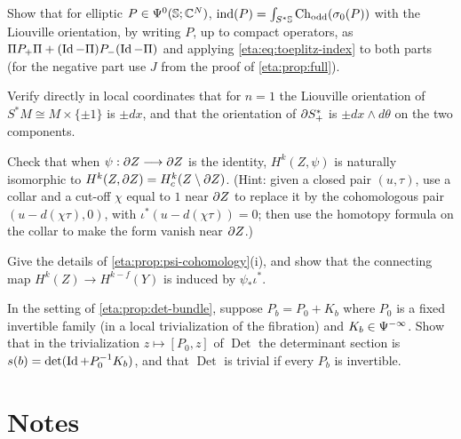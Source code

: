 \begin{exercise}\label{eta:ex:circle-AS}
Show that for elliptic $P\in\Psi^{0}(\mathbb{S};\mathbb{C}^N)$,
$\operatorname{ind}(P)=\int_{S^*\mathbb{S}}\operatorname{Ch}_{\mathrm{odd}}(\sigma_0(P))$ with the Liouville orientation, by writing
$P$, up to compact operators, as $\Pi P_+\Pi+(\operatorname{Id}-\Pi)P_-(\operatorname{Id}-\Pi)$ and applying
\eqref{eta:eq:toeplitz-index} to both parts (for the negative part use $J$ from the proof of
\cref{eta:prop:full}).
\end{exercise}

\begin{exercise}\label{eta:ex:orientation}
Verify directly in local coordinates that for $n=1$ the Liouville orientation of
$S^*M\cong M\times\{\pm1\}$ is $\pm dx$, and that the orientation of $\partial S^*_+$ is
$\pm dx\wedge d\theta$ on the two components.
\end{exercise}

\begin{exercise}\label{eta:ex:relative}
Check that when $\psi:\partial Z\longrightarrow\partial Z$ is the identity, $H^k(Z,\psi)$ is
naturally isomorphic to $H^k(Z,\partial Z)=H^k_c(Z\setminus\partial Z)$. (Hint: given a closed pair
$(u,\tau)$, use a collar and a cut-off $\chi$ equal to $1$ near $\partial Z$ to replace it by the
cohomologous pair $(u-d(\chi\tau),0)$, with $\iota^*(u-d(\chi\tau))=0$; then use the
homotopy formula on the collar to make the form vanish near $\partial Z$.)
\end{exercise}

\begin{exercise}\label{eta:ex:les}
Give the details of \cref{eta:prop:psi-cohomology}(i), and show that the connecting map
$H^k(Z)\longrightarrow H^{k-f}(Y)$ is induced by $\psi_*\iota^*$.
\end{exercise}

\begin{exercise}\label{eta:ex:det-section}
In the setting of \cref{eta:prop:det-bundle}, suppose $P_b=P_0+K_b$ where $P_0$ is a
fixed invertible family (in a local trivialization of the fibration) and
$K_b\in\Psi^{-\infty}$. Show that in the trivialization $z\mapsto[P_0,z]$ of
$\operatorname{Det}$ the determinant section is $s(b)=\det(\operatorname{Id}+P_0^{-1}K_b)$, and that
$\operatorname{Det}$ is trivial if every $P_b$ is invertible.
\end{exercise}

\section*{Notes}

